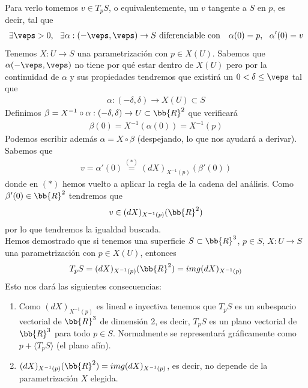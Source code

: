 \begin{observacion}
    Para verlo tomemos $v\in T_pS$, o equivalentemente, un $v$ tangente a $S$ en $p$, es decir, tal que
    \begin{gather*}
        \exists \veps > 0,\ \ \exists \alpha:(-\veps, \veps) \to S\text{ diferenciable con }\ \ \alpha(0)=p,\ \ \alpha'(0)=v
    \end{gather*}
    Tenemos $X:U\to S$ una parametrización con $p\in X(U)$. Sabemos que $\alpha(-\veps, \veps)$ no tiene por qué estar dentro de $X(U)$ pero por la continuidad de $\alpha$ y sus propiedades tendremos que existirá un $0 < \delta \leq \veps$ tal que 
    \begin{gather*}
        \alpha : (-\delta, \delta) \to X(U)\subset S
    \end{gather*}
    Definimos $\beta = X^{-1} \circ \alpha : (-\delta, \delta) \to U\subset \bb{R}^2$ que verificará
    \begin{gather*}
        \beta(0) = X^{-1}(\alpha(0)) = X^{-1}(p)
    \end{gather*}
    Podemos escribir además $\alpha = X \circ \beta$ (despejando, lo que nos ayudará a derivar). Sabemos que
    \begin{gather*}
        v = \alpha'(0) \overset{(\ast)}{=} (dX)_{X^{-1}(p)}(\beta'(0))
    \end{gather*}
    donde en $(\ast)$ hemos vuelto a aplicar la regla de la cadena del análisis. Como $\beta'(0)\in \bb{R}^2$ tendremos que 
    \begin{gather*}
        v \in (dX)_{X^{-1}(p)}(\bb{R}^2)
    \end{gather*}
    por lo que tendremos la igualdad buscada.\\

    Hemos demostrado que si tenemos una superficie $S\subset \bb{R}^3$, $p\in S$, $X:U\to S$ una parametrización con $p\in X(U)$, entonces 
    \begin{gather*}
        T_pS = (dX)_{X^{-1}(p)}(\bb{R}^2) = img(dX)_{X^{-1}(p)}
    \end{gather*}
    Esto nos dará las siguientes consecuencias:
    \begin{enumerate}
        \item Como $(dX)_{X^{-1}(p)}$ es lineal e inyectiva tenemos que $T_pS$ es un subespacio vectorial de $\bb{R}^3$ de dimensión 2, es decir, $T_pS$ es un plano vectorial de $\bb{R}^3$ para todo $p\in S$. Normalmente se representará gráficamente como $p + \langle T_pS \rangle$ (el plano afín).
        
        \item $(dX)_{X^{-1}(p)}(\bb{R}^2) = img(dX)_{X^{-1}(p)}$, es decir, no depende de la parametrización $X$ elegida.
        

\end{enumerate}
\end{observacion}
